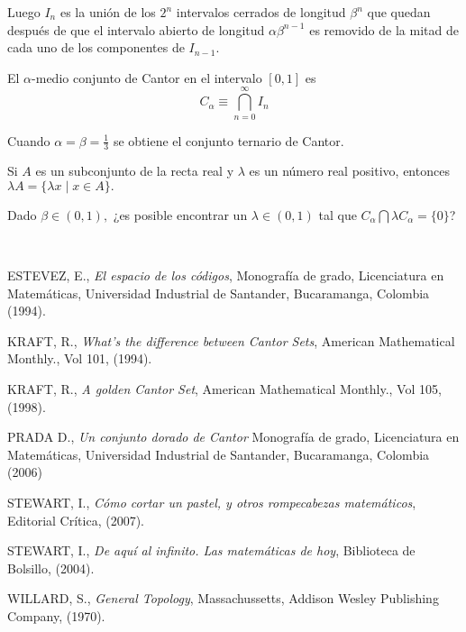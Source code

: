 \begin{titlepage}
\begin{minipage}{0.85\linewidth}
\begin{minipage}{0.85\linewidth}
\begin{resumen}
\begin{definicion}
Luego $I_n$ es la uni\'on de los $2^n$ intervalos cerrados de longitud
$\beta^n$ que quedan despu\'es de que el intervalo abierto de longitud
$\alpha \beta^{n-1}$ es removido de la mitad de cada uno de los
componentes de $I_{n-1}.$
\end{definicion}

\begin{definicion}
El $\alpha$-medio conjunto de Cantor en el intervalo $[0,1]$ es
$$C_{\alpha}\equiv \bigcap_{n=0}^{\infty}I_n$$
\end{definicion}

Cuando $\alpha=\beta=\frac{1}{3}$ se obtiene el conjunto ternario de
Cantor.

\begin{definicion}
Si $A$ es un subconjunto de la recta real y $\lambda$ es un n\'umero
real positivo, entonces $\lambda A=\{\lambda x\mid x\in A\}.$
\end{definicion}

\begin{pregunta}
Dado $\beta\in (0,1),$ ¿es posible encontrar un $\lambda\in(0,1)$
tal que $C_{\alpha}\bigcap \lambda C_{\alpha}=\{0\}$?
\end{pregunta}
    \end{resumen}
   \end{minipage}
   \vspace{10pt}
\end{minipage}
\vspace{10pt}\\[5pt]
  \vspace{10pt}
\begin{thebibliography}{99}
 ESTEVEZ, E., \textit{El espacio de los c\'odigos}, Monograf\'ia de grado, Licenciatura en Matem\'aticas,
Universidad Industrial de Santander, Bucaramanga, Colombia (1994).

 KRAFT, R., \textit{What's the difference between Cantor Sets},
American Mathematical Monthly., Vol 101, (1994).

 KRAFT, R., \textit{A golden Cantor Set},
American Mathematical Monthly., Vol 105, (1998).

 PRADA D., \textit{Un conjunto dorado de Cantor}
Monograf\'ia de grado, Licenciatura en Matem\'aticas, Universidad
Industrial de Santander, Bucaramanga, Colombia (2006)

 STEWART, I., \textit{C\'omo cortar un pastel, y otros rompecabezas matem\'aticos},
Editorial Cr\'itica, (2007).

 STEWART, I., \textit{De aqu\'i al infinito.  Las matem\'aticas de hoy},
Biblioteca de Bolsillo, (2004).

 WILLARD, S., \textit{General Topology},
Massachussetts, Addison Wesley Publishing Company, (1970).
\end{thebibliography}
\end{titlepage}
